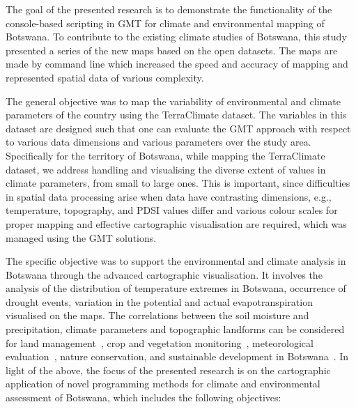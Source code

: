 \documentclass[ijgi,article,accept,pdftex,moreauthors]{Definitions/mdpi}
\begin{document}
The goal of the presented research is to demonstrate the functionality of the console-based scripting in GMT for climate and environmental mapping of Botswana. To contribute to the existing climate studies of Botswana, this study presented a series of the new maps based on the open datasets. The maps are made by command line which increased the speed and accuracy of mapping and represented spatial data of various complexity. 

The general objective was to map the variability of environmental and climate parameters of the country using the TerraClimate dataset. The variables in this dataset are designed such that one can evaluate the GMT approach with respect to various data dimensions and various parameters over the study area. Specifically for the territory of Botswana, while mapping the TerraClimate dataset, we address handling and visualising the diverse extent of values in climate parameters, from small to large ones. %
This is important, since difficulties in spatial data processing arise when data have contrasting dimensions, e.g., temperature, topography, and PDSI values differ and  various colour scales for proper mapping and effective cartographic visualisation are required, which was managed using the GMT solutions.

The specific objective was to support the environmental and climate analysis in Botswana through the advanced cartographic visualisation. It involves the analysis of the distribution of temperature extremes in Botswana, occurrence of drought events, variation in the potential and actual evapotranspiration visualised on the maps. The correlations between the soil moisture and precipitation, climate parameters and topographic landforms can be considered for land management~\cite{REED2010149,Jovanovic,Basupi2017,Mfundisi}, crop and vegetation monitoring~\cite{9792979,Tsheboeng}, meteorological evaluation~\cite{Moses2019}, nature conservation, and sustainable development in Botswana~\cite{Mogome,Lange}. In light of the above, the focus of the presented research is on the cartographic application of novel programming methods for climate and environmental assessment of Botswana, which includes the following objectives:
\end{document}

